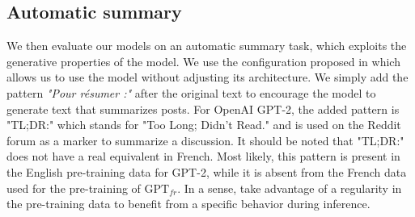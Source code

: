 
\subsection{Automatic summary} 

We then evaluate our models on an automatic summary task, which exploits the generative properties of the model. We use the configuration proposed in \cite{radford_2018} which allows us to use the model without adjusting its architecture. We simply add the pattern \textit{"Pour résumer :"} after the original text to encourage the model to generate text that summarizes posts. For OpenAI GPT-2, the added pattern is "TL;DR:" which stands for "Too Long; Didn't Read." and is used on the Reddit forum as a marker to summarize a discussion. It should be noted that "TL;DR:" does not have a real equivalent in French. Most likely, this pattern is present in the English pre-training data for GPT-2, while it is absent from the French data used for the pre-training of $\text{GPT}_{fr}$. In a sense, \cite{radford_2018} take advantage of a regularity in the pre-training data to benefit from a specific behavior during inference.

\begin{table}[!ht]
\footnotesize
{}
\caption{Comparison of the generated abstracts with the title of the article or the proposed synthesis. We use the ROUGE score and the OrangeSum corpus \parencite{kamal_20}. Our models are used in learning without examples and thus without updating the parameters on the training set. We indicate the best results in \textbf{bold}. We report the F1-score for each ROUGE measure.}
\end{table}

